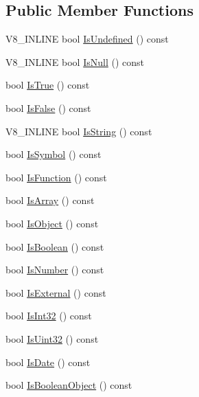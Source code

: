 \subsection*{Public Member Functions}
\begin{DoxyCompactItemize}
\item 
V8\+\_\+\+I\+N\+L\+I\+N\+E bool \hyperlink{classv8_1_1_value_aea287b745656baa8a12a2ae1d69744b6}{Is\+Undefined} () const 
\item 
V8\+\_\+\+I\+N\+L\+I\+N\+E bool \hyperlink{classv8_1_1_value_aa2c6ed8ef832223a7e2cd81e6ac61c78}{Is\+Null} () const 
\item 
bool \hyperlink{classv8_1_1_value_a8f27462322186b295195eecb3e81d6d7}{Is\+True} () const 
\item 
bool \hyperlink{classv8_1_1_value_a68c0296071d01ca899825d7643cf495a}{Is\+False} () const 
\item 
V8\+\_\+\+I\+N\+L\+I\+N\+E bool \hyperlink{classv8_1_1_value_ab23a34b7df62806808e01b0908bf5f00}{Is\+String} () const 
\item 
bool \hyperlink{classv8_1_1_value_af3e6081c22d09a7bbc0a2aff59ed60a5}{Is\+Symbol} () const 
\item 
bool \hyperlink{classv8_1_1_value_a05532a34cdd215f273163830ed8b77e7}{Is\+Function} () const 
\item 
bool \hyperlink{classv8_1_1_value_aaee0b144087d20eae02314c9393ff80f}{Is\+Array} () const 
\item 
bool \hyperlink{classv8_1_1_value_a355b7991c5c978c0341f6f961b63c5a2}{Is\+Object} () const 
\item 
bool \hyperlink{classv8_1_1_value_a0aceb7645e71b096df5cd73d1252b1b0}{Is\+Boolean} () const 
\item 
bool \hyperlink{classv8_1_1_value_a1bd51e3e55f67c65b9a8f587fbffb7c7}{Is\+Number} () const 
\item 
bool \hyperlink{classv8_1_1_value_a7ac61a325c18af8dcb6d7d5bf47d2503}{Is\+External} () const 
\item 
bool \hyperlink{classv8_1_1_value_a01e1db51c65b2feace248b7acbf71a2c}{Is\+Int32} () const 
\item 
bool \hyperlink{classv8_1_1_value_a783c89631bac4ef3c4b909f40cc2b8d8}{Is\+Uint32} () const 
\item 
bool \hyperlink{classv8_1_1_value_a8bc11fab0aded4a805722ab6df173cae}{Is\+Date} () const 
\item 
bool \hyperlink{classv8_1_1_value_abe7bc06283e5e66013f2f056a943168b}{Is\+Boolean\+Object} () const 
\item 

\end{DoxyCompactItemize}
